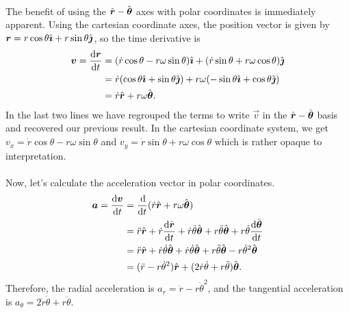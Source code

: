 \documentclass[../classical_mechanics.tex]{subfiles}
\begin{document}
        \paragraph{}
        The benefit of using the $\hat{\boldsymbol{r}}-\hat{\boldsymbol{\theta}}$ axes with polar coordinates is immediately apparent.
        Using the cartesian coordinate axes, the position vector is given by $\boldsymbol{r}=r\cos\theta\hat{\boldsymbol{\imath}}+r\sin\theta\hat{\boldsymbol{\jmath}}$, so the time derivative is
        \begin{align}
            \vec{v}=\dv{\vec{r}}{t}&=(\dot{r}\cos\theta-r\omega\sin\theta)\ihat+(\dot{r}\sin\theta+r\omega\cos\theta)\jhat\label{eq:2d-polar-velocity-cartesian}\\
            &=\dot{r}(\cos\theta\ihat+\sin\theta\jhat)+r\omega(-\sin\theta\ihat+\cos\theta\jhat)\\
            &=\dot{r}\uvec{r}+r\omega\uvec{\theta}.
        \end{align}
        In the last two lines we have regrouped the terms to write $\vec{v}$ in the $\hat{\boldsymbol{r}}-\hat{\boldsymbol{\theta}}$ basis and recovered our previous result.
        In the cartesian coordinate system, we get $v_x=\dot{r}\cos\theta-r\omega\sin\theta$ and $v_y=\dot{r}\sin\theta+r\omega\cos\theta$ which is rather opaque to interpretation.

        \paragraph{}
        Now, let's calculate the acceleration vector in polar coordinates.
        \begin{align}
            \vec{a}=\dv{\vec{v}}{t}&=\dv{}{t}(\dot{r}\uvec{r}+r\omega\uvec{\theta})\\
            &=\ddot{r}\uvec{r}+\dot{r}\dv{\uvec{r}}{t}+\dot{r}\dot{\theta}\uvec{\theta}+r\ddot{\theta}\uvec{\theta}+r\dot{\theta}\dv{\uvec{\theta}}{t}\\
            &=\ddot{r}\uvec{r}+\dot{r}\dot{\theta}\uvec{\theta}+\dot{r}\dot{\theta}\uvec{\theta}+r\ddot{\theta}\uvec{\theta}-r\dot{\theta}^2\uvec{\theta}\\
            &=(\ddot{r}-r\dot{\theta}^2)\uvec{r}+(2\dot{r}\dot{\theta}+r\ddot{\theta})\uvec{\theta}.\label{eq:2d-polar-acceleration}
        \end{align}
        Therefore, the radial acceleration is $a_r=\ddot{r}-r\dot{\theta}^2$, and the tangential acceleration is $a_\theta= 2\dot{r}\dot{\theta}+r\ddot{\theta}$.
\end{document}
